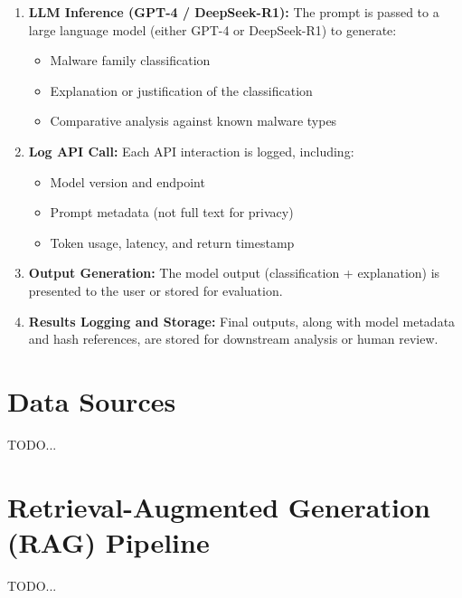 \begin{enumerate}
    \item \textbf{LLM Inference (GPT-4 / DeepSeek-R1):} The prompt is passed to a large language model (either GPT-4 or DeepSeek-R1) to generate:
          \begin{itemize}
              \item Malware family classification
              \item Explanation or justification of the classification
              \item Comparative analysis against known malware types
          \end{itemize}

    \item \textbf{Log API Call:} Each API interaction is logged, including:
          \begin{itemize}
              \item Model version and endpoint
              \item Prompt metadata (not full text for privacy)
              \item Token usage, latency, and return timestamp
          \end{itemize}

    \item \textbf{Output Generation:} The model output (classification + explanation) is presented to the user or stored for evaluation.

    \item \textbf{Results Logging and Storage:} Final outputs, along with model metadata and hash references, are stored for downstream analysis or human review.
\end{enumerate}

\section{Data Sources}
TODO...

\section{Retrieval-Augmented Generation (RAG) Pipeline}
TODO...

